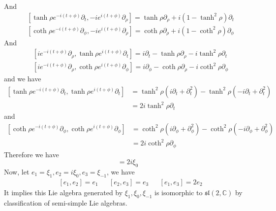 And
\begin{eqnarray}
	&[\tanh \rho e^{-i(t+\phi)} \partial_t, -i e^{i(t+\phi)} \partial_\rho] = \tanh \rho \partial_\rho + i(1 - \tanh^2\rho) \partial_t\\
	&[\coth \rho e^{-i(t+\phi)} \partial_\phi , -i e^{i(t+\phi)} \partial_\rho] = \coth \rho \partial_\rho + i(1 - \coth^2\rho) \partial_\phi
\end{eqnarray}
And
\begin{eqnarray}
	&[i e^{-i(t+\phi)} \partial_\rho, \tanh \rho e^{i(t+\phi)} \partial_t] = i \partial_{t} - \tanh\rho \partial_{\rho} - i\tanh^2\rho \partial_t\\
	&[i e^{-i (t+\phi)} \partial_\rho, \coth \rho e^{i(t+ \phi)} \partial_\phi] = i \partial_{\phi} - \coth \rho \partial_\rho - i \coth^2 \rho \partial_{\phi}
\end{eqnarray}
and we have 
\begin{equation}
	\begin{split}
	[\tanh \rho e^{-i(t+\phi)} \partial_t, \tanh \rho e^{i(t+\phi)} \partial_t] &= \tanh^2\rho (i \partial_t + \partial^2_t) - \tanh^2\rho ( -i \partial_t + \partial^2_t)\\
	& = 2i \tanh^2\rho \partial_t
	\end{split}
\end{equation}
and
\begin{equation}
\begin{split}
[\coth \rho e^{-i(t+\phi)} \partial_\phi, \coth \rho e^{i(t+\phi)} \partial_\phi] &= \coth^2\rho (i \partial_\phi + \partial^2_\phi) - \coth^2\rho ( -i \partial_\phi + \partial^2_\phi)\\
& = 2i \coth^2\rho \partial_\phi
\end{split}
\end{equation}
Therefore we have 
\begin{equation}
	[\xi_{-1},\xi_1] = 2i \xi_0
\end{equation}
Now, let $e_1 = \xi_{1}, e_2= i \xi_{0}, e_3= \xi_{-1}$, we have 
\begin{equation}
	\begin{aligned}
 &[e_1,e_2]= e_1 & & [e_2,e_3] = e_3 & &[e_1,e_3] = 2 e_2
	\end{aligned}
\end{equation}
It implies this Lie algebra generated by $\xi_1, \xi_0, \xi_{-1}$ is isomorphic to $\mathfrak{sl}(2,\mathbb{C})$ by classification of semi-simple Lie algebras.